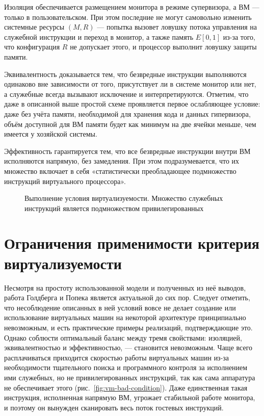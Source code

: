 \begin{itemize*}
    \item Изоляция обеспечивается размещением монитора в режиме супервизора, а ВМ --- только в пользовательском. При этом последние не могут самовольно изменить системные ресурсы $(M,R)$ --- попытка вызовет ловушку потока управления на служебной инструкции и переход в монитор, а также память $E[0,1]$ из-за того, что конфигурация $R$ не допускает этого, и процессор выполнит ловушку защиты памяти.
    \item Эквивалентность доказывается тем, что безвредные инструкции выполняются одинаково вне зависимости от того, присутствует ли в системе монитор или нет, а служебные всегда вызывают исключение и интерпретируются. Отметим, что даже в описанной выше простой схеме проявляется первое ослабляющее условие: даже без учёта памяти, необходимой для хранения кода и данных гипервизора, объём доступной для ВМ памяти будет как минимум на две ячейки меньше, чем имеется у хозяйской системы.
    \item Эффективность гарантируется тем, что все безвредные инструкции внутри ВМ исполняются напрямую, без замедления. При этом подразумевается, что их множество включает в себя «статистически преобладающее подмножество инструкций виртуального процессора».
\end{itemize*}

\begin{figure}[htb]
    \centering
    \caption[Выполнение условия виртуализуемости]{Выполнение условия виртуализуемости. Множество служебных инструкций является подмножеством привилегированных}
    \label{fig:vm-sufficient-condition}
\end{figure}

\section{Ограничения применимости критерия виртуализуемости}\label{sec:revising-efficiency}

Несмотря на простоту использованной модели и полученных из неё выводов, работа Голдберга и Попека является актуальной до сих пор. Следует отметить, что несоблюдение описанных в ней условий вовсе не делает создание или использование виртуальных машин на некоторой архитектуре принципиально невозможным, и есть практические примеры реализаций, подтверждающие это. Однако соблюсти оптимальный баланс между тремя свойствами: изоляцией, эквивалентностью и эффективностью, --- становится невозможным. Чаще всего расплачиваться приходится скоростью работы виртуальных машин из-за необходимости тщательного поиска и программного контроля за исполнением ими служебных, но не привилегированных инструкций, так как сама аппаратура не обеспечивает этого (рис.~\ref{fig:vm-bad-condition}). Даже единственная такая инструкция, исполненная напрямую ВМ, угрожает стабильной работе монитора, и поэтому он вынужден сканировать весь поток гостевых инструкций.

